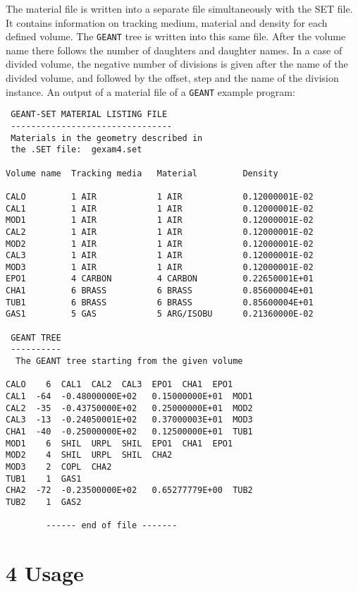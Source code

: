The material file is written into a separate file simultaneously with the
SET file. It contains information on tracking medium, material and density for
each defined volume. The {\tt GEANT} tree is written into this same file. After
 the
volume name there follows the number of daughters and daughter names.
In a case of divided volume, the negative number of divisions is given after
the name of the divided volume, and followed by the offset, step
and the name of the division instance.
An output of a material file of a {\tt GEANT} example program:
 
\footnotesize{
\begin{verbatim}
 GEANT-SET MATERIAL LISTING FILE
 --------------------------------
 Materials in the geometry described in
 the .SET file:  gexam4.set
 
Volume name  Tracking media   Material         Density
 
CALO         1 AIR            1 AIR            0.12000001E-02
CAL1         1 AIR            1 AIR            0.12000001E-02
MOD1         1 AIR            1 AIR            0.12000001E-02
CAL2         1 AIR            1 AIR            0.12000001E-02
MOD2         1 AIR            1 AIR            0.12000001E-02
CAL3         1 AIR            1 AIR            0.12000001E-02
MOD3         1 AIR            1 AIR            0.12000001E-02
EPO1         4 CARBON         4 CARBON         0.22650001E+01
CHA1         6 BRASS          6 BRASS          0.85600004E+01
TUB1         6 BRASS          6 BRASS          0.85600004E+01
GAS1         5 GAS            5 ARG/ISOBU      0.21360000E-02
 
 GEANT TREE
 ----------
  The GEANT tree starting from the given volume
 
CALO    6  CAL1  CAL2  CAL3  EPO1  CHA1  EPO1
CAL1  -64  -0.48000000E+02   0.15000000E+01  MOD1
CAL2  -35  -0.43750000E+02   0.25000000E+01  MOD2
CAL3  -13  -0.24050001E+02   0.37000003E+01  MOD3
CHA1  -40  -0.25000000E+02   0.12500000E+01  TUB1
MOD1    6  SHIL  URPL  SHIL  EPO1  CHA1  EPO1
MOD2    4  SHIL  URPL  SHIL  CHA2
MOD3    2  COPL  CHA2
TUB1    1  GAS1
CHA2  -72  -0.23500000E+02   0.65277779E+00  TUB2
TUB2    1  GAS2
 
        ------ end of file -------
\end{verbatim}
}
\normalsize
 
\section*{4 Usage}
 
